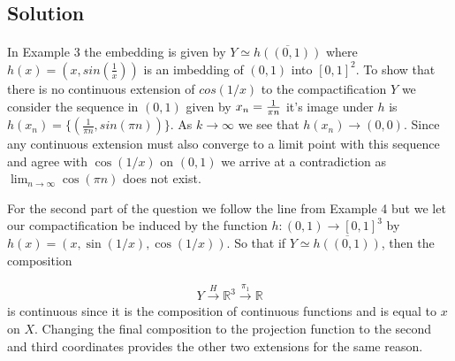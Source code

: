 \documentclass[11pt, oneside]{article}   	%
\newcommand{\R}{\mathbb{R}}
\newcommand{\set}[1]{\{ #1 \}}
\begin{document}
\subsection*{Solution}
\paragraph{}

In Example 3 the embedding is given by $Y \simeq \overline{h((0,1))}$ where $h(x) = (x,sin(\frac{1}{x}))$ is an imbedding of $(0,1)$ into $[0,1]^2$. To show that there is no continuous extension of $cos(1/x)$ to the compactification $Y$ we consider the sequence in $(0,1)$ given by $x_n = {1 \over \pi n}$ it's image under $h$ is $h(x_n) = \set{(\frac{1}{\pi n}, sin(\pi n))}$. As $k \to \infty$ we see that $h(x_n) \to (0,0)$. Since any continuous extension must also converge to a limit point with this sequence and agree with $\cos(1/x)$ on $(0,1)$ we arrive at a contradiction as $\lim_{n \to \infty} \cos(\pi n)$ does not exist.

For the second part of the question we follow the line from Example 4 but we let our compactification be induced by the function $h:(0,1) \to [0,1]^3$ by $h(x) = (x,\sin(1/x),\cos(1/x))$. So that if $Y \simeq \overline{h((0,1))}$, then the composition

\begin{eqnarray*}
Y \xrightarrow{H} \R^3 \xrightarrow{\pi_1} \R
\end{eqnarray*}
is continuous since it is the composition of continuous functions and is equal to $x$ on $X$. Changing the final composition to the projection function to the second and third coordinates provides the other two extensions for the same reason.






 
\end{document}
